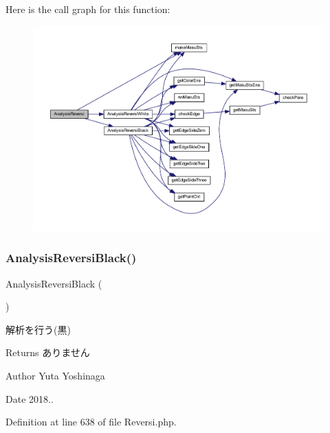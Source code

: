 Here is the call graph for this function\+:
\nopagebreak
\begin{figure}[H]
\begin{center}
\leavevmode
\includegraphics[width=350pt]{class_reversi_ae15e49622562732d31d44a75a14c3b45_cgraph}
\end{center}
\end{figure}
\mbox{\label{class_reversi_a471972ec549188f7eb701d57e14ae7a1}} 
\subsubsection{\texorpdfstring{Analysis\+Reversi\+Black()}{AnalysisReversiBlack()}}
{\footnotesize\ttfamily Analysis\+Reversi\+Black (\begin{DoxyParamCaption}{ }\end{DoxyParamCaption})\hspace{0.3cm}{\ttfamily [private]}}



解析を行う(黒) 

\begin{DoxyReturn}{Returns}
ありません 
\end{DoxyReturn}
\begin{DoxyAuthor}{Author}
Yuta Yoshinaga 
\end{DoxyAuthor}
\begin{DoxyDate}{Date}
2018.. 
\end{DoxyDate}


Definition at line 638 of file Reversi.\+php.



